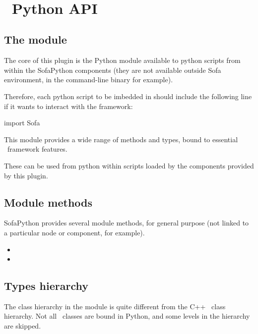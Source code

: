 \

\section{\sofa \ Python API}

\subsection{The  module}

The core of this plugin is the  Python module available to python scripts from within the SofaPython components (they are not available outside Sofa environment, in the command-line  binary for example).

Therefore, each python script to be imbedded in \sofa should include the following line if it wants to interact with the \sofa framework:

\begin{code_python}
import Sofa
\end{code_python}

This module provides a wide range of methods and types, bound to essential \sofa \ framework features.

These can be used from python within scripts loaded by the components provided by this plugin.

\subsection{Module methods}

SofaPython provides several module methods, for general purpose (not linked to a particular node or component, for example).

\begin{itemize}
\item {} 
\item {}
\end{itemize}

\subsection{Types hierarchy}

The class hierarchy in the  module is quite different from the C++ \sofa \ class hierarchy. Not all \sofa \ classes are bound in Python, and some levels in the hierarchy are skipped.

